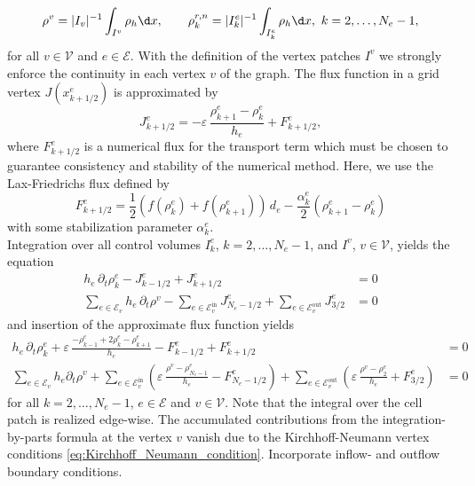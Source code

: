 \begin{align*}	
	\rho^{v}= |I_v|^{-1}\int_{I^v}\rho_h\d x, \qquad
	\rho_k^{r,n} = |I_k^e|^{-1}\int_{I_k^e} \rho_h\d x,\ k=2,\ldots,N_e-1,
\end{align*}
for all $v \in \mathcal{V}$ and $e \in \mathcal{E}$. With the definition of the vertex patches $I^v$ we strongly enforce the continuity in each vertex $v$ of the graph. The flux function in a grid vertex $J(x^e_{k+1/2})$ is approximated by
\begin{equation*}
	J_{k+1/2}^e = -\varepsilon\,\frac{\rho_{k+1}^e-\rho_k^e}{h_e}
	+ F^e_{k+1/2},
\end{equation*}
where $F^e_{k+1/2}$ is a numerical flux for the transport term which must be chosen to guarantee consistency and stability of the numerical method. Here, we use the Lax-Friedrichs flux defined by
\begin{equation*}
	F^e_{k+1/2} = \frac{1}{2} (f(\rho_k^e) + f(\rho_{k+1}^e))\,d_e - \frac{\alpha_k^e}2
	(\rho_{k+1}^e - \rho_k^e) 
\end{equation*}
with some stabilization parameter $\alpha_k^e$. \\
Integration over all control volumes $I_k^e$, $k=2,\ldots,N_e-1$, and $I^v$, $v\in \mathcal{V}$, yields the equation
\begin{align*}
	h_e\,\partial_t \rho_k^e - J^e_{k-1/2} + J^e_{k+1/2} &= 0 \\
	\sum_{e\in \mathcal{E}_v} h_e\,\partial_t \rho^v
	- \sum_{e\in \mathcal{E}_v^{\text{in}}} J^e_{N_e-1/2} 
	+ \sum_{e\in \mathcal{E}_v^{\text{out}}} J^e_{3/2} &= 0
\end{align*}
and insertion of the approximate flux function yields
\begin{align*}
	h_e\,\partial_t \rho_k^e + \varepsilon\,\frac{-\rho_{k-1}^e +
	2\rho_k^e - \rho_{k+1}^e}{h_e} - F_{k-1/2}^e + F_{k+1/2}^e &= 0
	  \\
	\sum_{e\in \mathcal{E}_v} h_e\partial_t\rho^v
	+ \sum_{e\in \mathcal{E}_v^{\text{in}}}
	\left(\varepsilon\,\frac{\rho^v-\rho_{N_e-1}^e}{h_e} -
	F^e_{N_e-1/2}\right)
	+ \sum_{e\in \mathcal{E}_v^{\text{out}}}
	\left(\varepsilon\,\frac{\rho^v-\rho_2^e}{h_e} + F^e_{3/2}\right)
	&= 0
\end{align*}
for all $k = 2,\ldots,N_e-1$, $e\in \mathcal{E}$ and $v \in \mathcal{V}$. Note that the integral over the cell patch is realized edge-wise. The accumulated contributions from the integration-by-parts formula at the vertex $v$ vanish due to the Kirchhoff-Neumann vertex conditions \eqref{eq:Kirchhoff_Neumann_condition}. Incorporate inflow- and outflow boundary conditions. \\
